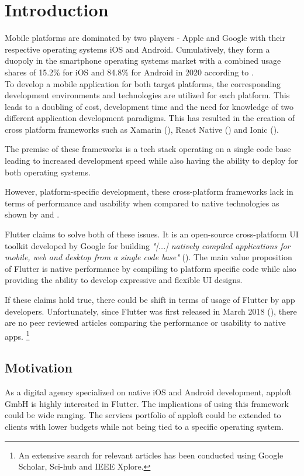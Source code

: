 \chapter{Introduction}
Mobile platforms are dominated by two players - Apple and Google with their respective operating systems iOS and Android. 
Cumulatively, they form a duopoly in the smartphone operating systems market with a combined usage shares of 
15.2\% for iOS and 84.8\% for Android in 2020 according to \textcite{IDC2021}.
\\To develop a mobile application for both target platforms, the corresponding development environments and technologies 
are utilized for each platform. This leads to a doubling of cost, development time and 
the need for knowledge of two different application development paradigms. 
This has resulted in the creation of cross platform frameworks such as Xamarin (\cite{Xamarin2021}), React Native (\cite{Facebook2021}) and Ionic (\cite{Ionic2021}). 

The premise of these frameworks is a tech stack operating on a single code base leading to increased development speed
while also having the ability to deploy for both operating systems.

However, platform-specific development, these cross-platform frameworks lack in terms of performance and 
usability when compared to native technologies as shown by \textcite{Mercado2016} and \textcite{Ebone2018}.

Flutter claims to solve both of these issues. It is an open-source cross-platform UI toolkit developed by Google for building 
\textit{"[...] natively compiled applications for mobile, web and desktop from a single code base"} (\cite{FlutterDev20}). 
The main value proposition of Flutter is native performance by compiling to platform specific code 
while also providing the ability to develop expressive and flexible UI designs.

If these claims hold true, there could be shift in terms of usage of Flutter by app developers. 
Unfortunately, since Flutter was first released in March 2018 (\cite{FlutterReleases2020}), 
there are no peer reviewed articles comparing the performance or usability to native apps.
\footnote{An extensive search for relevant articles has been conducted using Google Scholar, Sci-hub and IEEE Xplore.} 

\section{Motivation}
As a digital agency specialized on native iOS and Android development, apploft GmbH is highly interested in Flutter. 
The implications of using this framework could be wide ranging. 
The services portfolio of apploft could be extended to clients with lower budgets while not being tied to a specific operating system. 

